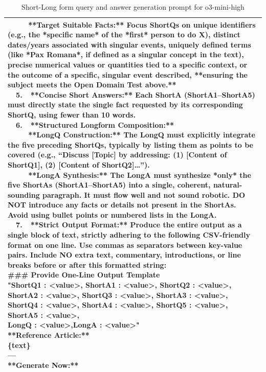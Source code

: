 \documentclass[11pt]{article}
\begin{document}
\begin{table}[t]
\begin{tabular}{@{}p{\textwidth}@{}}
{\ \ \ \ \ **Target Suitable Facts:** Focus ShortQs on unique identifiers (e.g., the *specific name* of the *first* person to do X), distinct dates/years associated with singular events, uniquely defined terms (like *Pax Romana*, if defined as a singular concept in the text), precise numerical values or quantities tied to a specific context, or the outcome of a specific, singular event described, **ensuring the subject meets the Open Domain Test above.**\\
\ \ 5.\ \ **Concise Short Answers:** Each ShortA (ShortA1--ShortA5) must directly state the single fact requested by its corresponding ShortQ, using fewer than 10 words.\\
\ \ 6.\ \ **Structured Longform Composition:**\\
\ \ \ \ \ **LongQ Construction:** The LongQ must explicitly integrate the five preceding ShortQs, typically by listing them as points to be covered (e.g., ``Discuss [Topic] by addressing: (1) [Content of ShortQ1], (2) [Content of ShortQ2]\ldots'').\\
\ \ \ \ \ **LongA Synthesis:** The LongA must synthesize *only* the five ShortAs (ShortA1--ShortA5) into a single, coherent, natural-sounding paragraph. It must flow well and not sound robotic. DO NOT introduce any facts or details not present in the ShortAs. Avoid using bullet points or numbered lists in the LongA.\\
\ \ 7.\ \ **Strict Output Format:** Produce the entire output as a single block of text, strictly adhering to the following CSV-friendly format on one line. Use commas as separators between key-value pairs. Include NO extra text, commentary, introductions, or line breaks before or after this formatted string:\\
\#\#\# Provide One-Line Output Template\\
"ShortQ1 : <value>, ShortA1 : <value>, ShortQ2 : <value>, ShortA2 : <value>, ShortQ3 : <value>, ShortA3 : <value>,\\
ShortQ4 : <value>, ShortA4 : <value>, ShortQ5 : <value>, ShortA5 : <value>,\\
LongQ : <value>,LongA : <value>"\\
**Reference Article:** \\
\{text\} \\
--- \\
**Generate Now:**\\
}\\
\hline
\end{tabular}
\caption{Short-Long form query and answer generation prompt for o3-mini-high}
\label{tab:prompt-dataset-generation}
\end{table}
\end{document}
